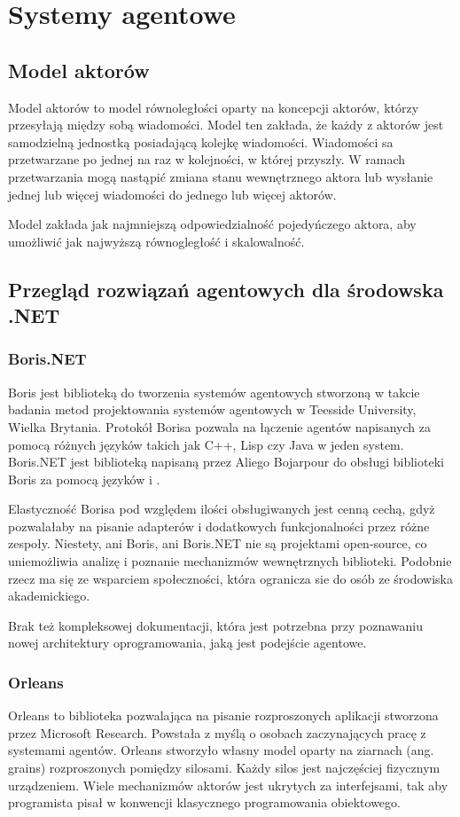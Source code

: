 \chapter{Systemy agentowe}
\section{Model aktorów}
Model aktorów to model równoległości oparty na koncepcji aktorów, którzy przesyłają między sobą wiadomości.
Model ten zakłada, że każdy z aktorów jest samodzielną jednostką posiadającą kolejkę wiadomości. Wiadomości sa przetwarzane po jednej na raz w kolejności, w której przyszły. W ramach przetwarzania mogą nastąpić zmiana stanu wewnętrznego aktora lub wysłanie jednej lub więcej wiadomości do jednego lub więcej aktorów. 

Model zakłada jak najmniejszą odpowiedzialność pojedyńczego aktora, aby umożliwić jak najwyższą równogległość i skalowalność.

\section{Przegląd rozwiązań agentowych dla środowska .NET}
\subsection{Boris.NET}
Boris jest biblioteką do tworzenia systemów agentowych stworzoną w takcie badania metod projektowania systemów agentowych w Teesside University, Wielka Brytania. Protokół Borisa pozwala na łączenie agentów napisanych za pomocą różnych języków takich jak C++, Lisp czy Java w jeden system. Boris.NET jest biblioteką napisaną przez Aliego Bojarpour do obsługi biblioteki Boris za pomocą języków \csh i \fsh. 

Elastyczność Borisa pod względem ilości obsługiwanych jest cenną cechą, gdyż pozwalałaby na pisanie adapterów i dodatkowych funkcjonalności przez różne zespoły. 
Niestety, ani Boris, ani Boris.NET nie są projektami open-source, co uniemożliwia analizę i poznanie mechanizmów wewnętrznych biblioteki. Podobnie rzecz ma się ze wsparciem społeczności, która ogranicza sie do osób ze środowiska akademickiego.

Brak też kompleksowej dokumentacji, która jest potrzebna przy poznawaniu nowej architektury oprogramowania, jaką jest podejście agentowe.

\subsection{Orleans}
Orleans to biblioteka pozwalająca na pisanie rozproszonych aplikacji stworzona przez Microsoft Research.
Powstała z myślą o osobach zaczynających pracę z systemami agentów. 
Orleans stworzyło własny model oparty na ziarnach (ang. grains) rozproszonych pomiędzy silosami. Każdy silos jest najczęściej fizycznym urządzeniem.
Wiele mechanizmów aktorów jest ukrytych za interfejsami, tak aby programista pisał w konwencji klasycznego programowania obiektowego.  

